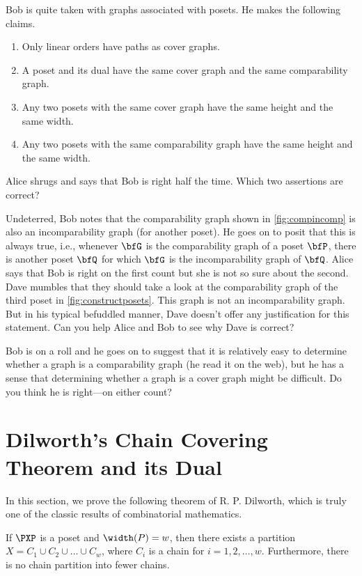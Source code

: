\begin{remark} Bob is quite taken with graphs associated with posets.  He makes the
following claims.

\begin{enumerate}
\item Only linear orders have paths as cover graphs.
\item A poset and its dual have the same cover graph and the
same comparability graph.  
\item Any two posets with the same cover graph have the same
height and the same width.
\item Any two posets with the same comparability graph have the
same height and the same width.
\end{enumerate}
Alice shrugs and says that Bob is right half the time.  Which two assertions
are correct?

Undeterred, Bob notes that the comparability graph shown in \autoref{fig:compincomp}
is also an incomparability graph (for another poset).  He goes on to posit that
this is always true, i.e., whenever $\bfG$ is the comparability graph of
a poset $\bfP$, there is another poset $\bfQ$ for which $\bfG$ is the incomparability
graph of $\bfQ$.  Alice says that Bob is right on the first count but she is
not so sure about the second.  Dave mumbles that they should take a look at
the comparability graph of the third poset in \autoref{fig:constructposets}.  This
graph is not an incomparability graph.  But in his typical befuddled manner,
Dave doesn't offer any justification for this statement.  Can you help Alice
and Bob to see why Dave is correct?

Bob is on a roll and he goes on to suggest that it is relatively easy to 
determine whether a graph is a comparability graph (he read it on the web), but he has a 
sense that determining whether a graph is a cover graph might be difficult.  
Do you think he is right---on
either count?  
\end{remark}

\section{Dilworth's Chain Covering Theorem and its Dual}\label{s:posets:dilworth}

In this section, we prove the following theorem of R. P. Dilworth,
which is truly one of the classic results of combinatorial mathematics.

\begin{theorem}\label{thm:dilworth}
If $\PXP$ is a poset and $\width(P)=w$, then there exists a 
partition $X=C_1\cup C_2\cup\dots \cup C_w$, where $C_i$ is a 
chain for $i=1,2,\dots,w$. Furthermore, there is no chain partition
into fewer chains.
\end{theorem}

